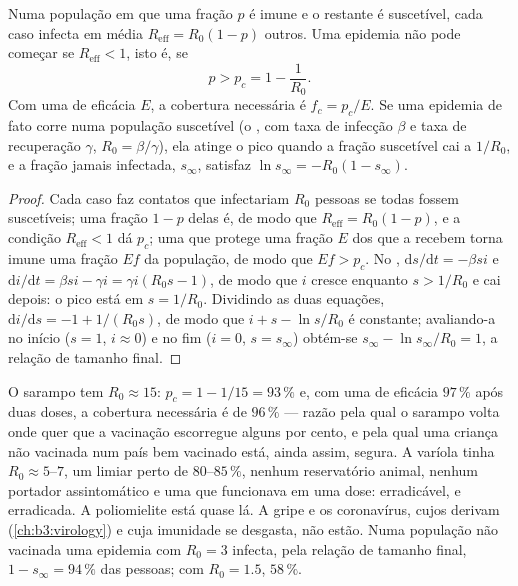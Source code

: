 \begin{theorem}\label{thm:b3:adaptive-immunity:herd}
Numa população em que uma fração $p$ é imune e o restante é suscetível,
cada caso infecta em média $R_{\text{eff}} = R_{0}(1 -
p)$ outros. Uma
epidemia não pode começar se $R_{\text{eff}} < 1$, isto é, se
\[
p > p_{c} = 1 - \frac{1}{R_{0}} .
\]
Com uma  de eficácia $E$, a cobertura necessária é $f_{c} = p_{c}/E$. Se uma epidemia de fato corre numa população suscetível (o
, com taxa de infecção $\beta$ e taxa de recuperação $\gamma$,
$R_{0} =
\beta/\gamma$), ela atinge o pico quando a fração suscetível
cai a $1/R_{0}$, e a fração jamais infectada, $s_{\infty}$, satisfaz
$\ln s_{\infty} = -R_{0}(1 - s_{\infty})$.
\end{theorem}
\begin{proof}
Cada caso faz contatos que infectariam $R_{0}$ pessoas se todas fossem
suscetíveis; uma fração $1 - p$ delas é, de modo que $R_{\text{eff}} =
R_{0}(1-p)$, e a condição $R_{\text{eff}} < 1$ dá $p_{c}$; uma  que
protege uma fração $E$ dos que a recebem torna imune uma fração $Ef$ da
população, de modo que $Ef > p_{c}$. No ,
$\mathrm{d}s/\mathrm{d}t = -\beta si$ e $\mathrm{d}i/\mathrm{d}t =
\beta si - \gamma i = \gamma i(R_{0}s - 1)$, de modo que $i$ cresce
enquanto $s >
1/R_{0}$ e cai depois: o pico está em $s = 1/R_{0}$.
Dividindo as duas equações, $\mathrm{d}i/\mathrm{d}s = -1 + 1/(R_{0}s)$,
de modo que $i + s -
\ln s/R_{0}$ é constante; avaliando-a no início
($s = 1$, $i
\approx 0$) e no fim ($i = 0$, $s = s_{\infty}$) obtém-se
$s_{\infty} - \ln s_{\infty}/R_{0} = 1$, a relação de tamanho final.
\end{proof}

\begin{example}\label{ex:b3:adaptive-immunity:measles}
O sarampo tem $R_{0} \approx 15$: $p_{c} = 1 - 1/15 = 93\,\%$ e, com uma
 de eficácia $97\,\%$ após duas doses, a cobertura necessária é de
$96\,\%$ --- razão pela qual o sarampo volta onde quer que a vacinação
escorregue alguns por cento, e pela qual uma criança não vacinada num
país bem vacinado está, ainda assim, segura. A varíola tinha $R_{0} \approx 5$--$7$, um limiar perto de $80$--$85\,\%$, nenhum reservatório
animal, nenhum portador assintomático e uma  que funcionava em
uma dose: erradicável, e erradicada. A poliomielite está quase lá. A
gripe e os coronavírus, cujos  derivam (\cref{ch:b3:virology})
e cuja imunidade se desgasta, não estão. Numa população não vacinada uma
epidemia com $R_{0} = 3$ infecta, pela relação de tamanho final, $1 - s_{\infty} = 94\,\%$ das pessoas; com $R_{0} = 1.5$, $58\,\%$.
\end{example}

